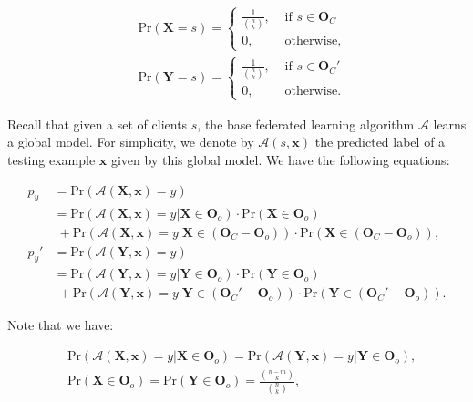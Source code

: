 \documentclass[letterpaper]{article} %
\begin{document}
\begin{align}
	&\text{Pr}(\mathbf{X}=s) = 
		\begin{cases}
 			\frac{1}{{n \choose k}}, &\text{ if } s \in \mathbf{O}_C\\
			0, 					   &\text{ otherwise},
		\end{cases}\\
	&\text{Pr}(\mathbf{Y}=s) = 
		\begin{cases}
 			\frac{1}{{n \choose k}}, &\text{ if } s \in \mathbf{O}_C'\\
			0, 					   &\text{ otherwise}.
		\end{cases}
\end{align}

Recall that given a set of clients $s$, the base federated learning algorithm $\mathcal{A}$ learns a global model. For simplicity, we denote by $\mathcal{A}(s,\mathbf{x})$ the predicted label of a testing example $\mathbf{x}$ given by this global model. 
We have the following equations:

\begin{align}
	p_y &= \text{Pr}(\mathcal{A}(\mathbf{X},\mathbf{x})=y)\\
		&= \text{Pr}(\mathcal{A}(\mathbf{X},\mathbf{x})=y|\mathbf{X}\in\mathbf{O}_o) \cdot \text{Pr}(\mathbf{X}\in\mathbf{O}_o) \nonumber\\\label{eq:subtract1}
		&\;+  \text{Pr}(\mathcal{A}(\mathbf{X},\mathbf{x})=y|\mathbf{X}\in(\mathbf{O}_C-\mathbf{O}_o)) \cdot \text{Pr}(\mathbf{X}\in(\mathbf{O}_C-\mathbf{O}_o)),\\
	p_y' &= \text{Pr}(\mathcal{A}(\mathbf{Y},\mathbf{x})=y)\\\label{eq:subtract2}
		&= \text{Pr}(\mathcal{A}(\mathbf{Y},\mathbf{x})=y|\mathbf{Y}\in\mathbf{O}_o) \cdot \text{Pr}(\mathbf{Y}\in\mathbf{O}_o) \nonumber\\
		&\;+  \text{Pr}(\mathcal{A}(\mathbf{Y},\mathbf{x})=y|\mathbf{Y}\in(\mathbf{O}_C'-\mathbf{O}_o)) \cdot \text{Pr}(\mathbf{Y}\in(\mathbf{O}_C'-\mathbf{O}_o)).
\end{align}

Note that we have:

\begin{align}
	&\text{Pr}(\mathcal{A}(\mathbf{X},\mathbf{x})=y|\mathbf{X}\in\mathbf{O}_o) = \text{Pr}(\mathcal{A}(\mathbf{Y},\mathbf{x})=y|\mathbf{Y}\in\mathbf{O}_o),\\
	&\text{Pr}(\mathbf{X}\in\mathbf{O}_o) = \text{Pr}(\mathbf{Y}\in\mathbf{O}_o) = \frac{{n-m \choose k}}{{n \choose k}}, 
\end{align}
\end{document}
